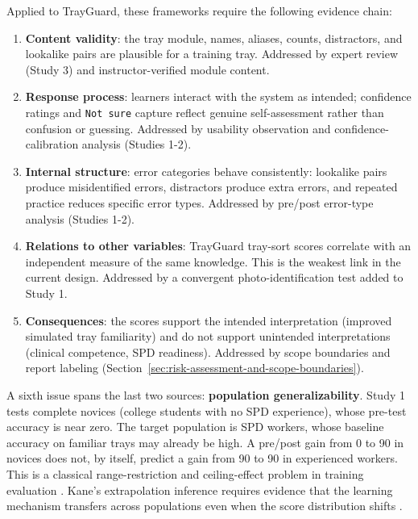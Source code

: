 \documentclass[10pt,a4paper]{article}
\begin{document}
Applied to TrayGuard, these frameworks require the following evidence chain:
\begin{enumerate}
  \item \textbf{Content validity}: the tray module, names, aliases, counts,
  distractors, and lookalike pairs are plausible for a training tray. Addressed
  by expert review (Study 3) and instructor-verified module content.
  \item \textbf{Response process}: learners interact with the system as intended;
  confidence ratings and \texttt{Not sure} capture reflect genuine self-assessment
  rather than confusion or guessing. Addressed by usability observation and
  confidence-calibration analysis (Studies 1-2).
  \item \textbf{Internal structure}: error categories behave consistently: lookalike
  pairs produce misidentified errors, distractors produce extra errors, and
  repeated practice reduces specific error types. Addressed by pre/post error-type
  analysis (Studies 1-2).
  \item \textbf{Relations to other variables}: TrayGuard tray-sort scores correlate
  with an independent measure of the same knowledge. This is the weakest link
  in the current design. Addressed by a convergent photo-identification test
  added to Study 1.
  \item \textbf{Consequences}: the scores support the intended interpretation
  (improved simulated tray familiarity) and do not support unintended
  interpretations (clinical competence, SPD readiness). Addressed by scope
  boundaries and report labeling (Section~\ref{sec:risk-assessment-and-scope-boundaries}).
\end{enumerate}

A sixth issue spans the last two sources: \textbf{population generalizability}.
Study 1 tests complete novices (college students with no SPD experience), whose
pre-test accuracy is near zero. The target population is SPD workers, whose
baseline accuracy on familiar trays may already be high. A pre/post gain from
0 to 90 in novices does not, by itself, predict a gain from 90 to 90 in
experienced workers. This is a classical range-restriction and ceiling-effect
problem in training evaluation \cite{arthur-et-al-2003}. Kane's extrapolation
inference requires evidence that the learning mechanism transfers across
populations even when the score distribution shifts
\cite{kane-validity-2013}.
\end{document}
